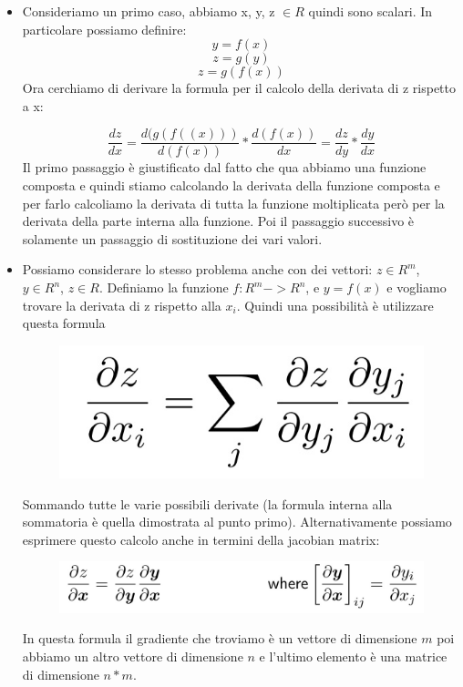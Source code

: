 \documentclass[14pt]{extreport}
\begin{document}
\begin{itemize}
	\item Consideriamo un primo caso, abbiamo x, y, z $\in R$ quindi sono scalari. In particolare possiamo definire:
	      $$y = f(x)$$
	      $$z = g(y)$$
	      $$z = g(f(x))$$ Ora cerchiamo di derivare la formula per il calcolo della derivata di z rispetto a x:

	      $$\frac{dz}{dx}=\frac{d(g(f((x)))}{d(f(x))}*\frac{d(f(x))}{dx} = \frac{dz}{dy}*\frac{dy}{dx}$$ Il primo passaggio è giustificato dal fatto
	      che qua abbiamo una funzione composta e quindi stiamo calcolando la derivata della funzione composta e per farlo calcoliamo la derivata di
	      tutta la funzione moltiplicata però per la derivata della parte interna alla funzione. Poi il passaggio successivo è solamente un passaggio
	      di sostituzione dei vari valori.
	\item Possiamo considerare lo stesso problema anche con dei vettori: $z \in R^m$, $y \in R^n$, $z \in R$. Definiamo la funzione $f:R^m -> R^n$, e
		      $y = f(x)$ e vogliamo trovare la derivata di z rispetto alla $x_i$. Quindi una possibilità è utilizzare questa formula \begin{figure}[H]
		      \centering
		      \includegraphics[width=0.7\linewidth]{382.jpeg}
	      \end{figure}
	      Sommando tutte le varie possibili derivate (la formula interna alla sommatoria è quella dimostrata al punto primo). Alternativamente
	      possiamo esprimere questo calcolo anche in termini della jacobian matrix:
	      \begin{figure}[H]
		      \centering
		      \includegraphics[width=0.7\linewidth]{383.jpeg}
	      \end{figure}
	      In questa formula il gradiente che troviamo è un vettore di dimensione $m$ poi abbiamo un altro vettore di dimensione $n$ e l'ultimo
	      elemento è una matrice di dimensione $n*m$.
\end{itemize}
\end{document}
